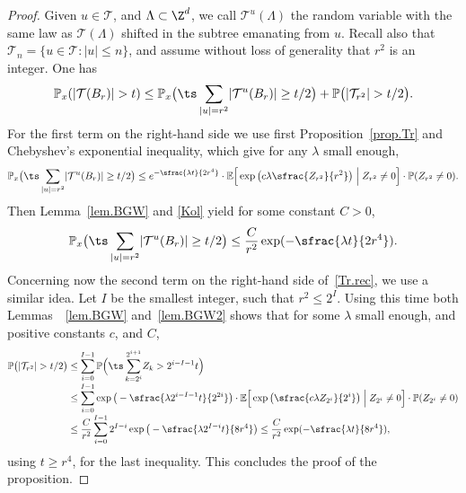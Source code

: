 \begin{proof}
Given $u\in \mathcal T$, and $\Lambda\subset \Z^d$, we
call $\mathcal T^u(\Lambda)$ the random variable with the same law
as $\mathcal T(\Lambda)$ shifted in the subtree emanating from $u$.
Recall also that \hbox{$\mathcal T_n=\{u\in \mathcal T: |u|\le n\}$}, and assume without loss of generality that $r^2$ is an integer.
One has\vspace*{-3pt}
\begin{equation}\label{Tr.rec}
\mathbb P_x(|\mathcal T(B_r)|>t) \le \mathbb P_x\big({\ts\sum_{|u|=r^2}} |\mathcal T^u(B_r)|\ge t/2\big)+
\mathbb P\big(|\mathcal T_{r^2}|>t/2\big).
\end{equation}
For the first term on the right-hand side we use first Proposition~\ref{prop.Tr} and Chebyshev's exponential inequality,
which give for any $\lambda$ small enough,\vspace*{-3pt}
\[
\mathbb P_x\big({\ts\sum_{|u|=r^2}} |\mathcal T^u(B_r)|\ge t/2\big) \le e^{- \sfrac{\lambda t}{2r^4}} \cdot \mathbb E\Big[\exp\big(c\lambda \sfrac{Z_{r^2}}{r^2}\big)\Bigm|Z_{r^2}\neq 0\Big]\cdot \mathbb P(Z_{r^2}\neq 0).
\]
Then Lemma~\ref{lem.BGW} and \eqref{Kol} yield for some constant $C>0$,\vspace*{-3pt}
\[
\mathbb P_x\big({\ts\sum_{|u|=r^2}} |\mathcal T^u(B_r)|\ge t/2\big)
\le \frac{C}{r^2} \exp(-\sfrac{\lambda t}{2r^4}).
\]
Concerning now the second term on the right-hand side of~\eqref{Tr.rec}, we use a similar idea.
Let $I$ be the smallest integer, such that $r^2\le 2^I$. Using this time both Lemmas~~\ref{lem.BGW} and~\ref{lem.BGW2} shows that
for some $\lambda$ small enough, and positive constants $c$, and $C$,\vspace*{-3pt}
\begin{align*}
\mathbb P\big(|\mathcal T_{r^2}|>t/2\big) & \le \sum_{i=0}^{I-1} \mathbb P\Big({\ts\sum_{k=2^i}^{2^{i+1}}} Z_k >2^{i-I-1} t\Big)\\[-3pt]
& \le \sum_{i=0}^{I-1} \exp\big(-\sfrac{\lambda 2^{i-I-1}t}{2^{2i}}\big)\cdot \mathbb E\Big[\exp\big(\sfrac{c\lambda Z_{2^i}}{2^i}\big)\Bigm|  Z_{2^i}\neq 0\Big]\cdot \mathbb P(Z_{2^i}\neq 0) \\[-3pt]
& \le \frac{C}{r^2} \sum_{i=0}^{I-1}2^{I-i} \exp\big(-\sfrac{\lambda 2^{I-i}t}{8r^4}\big) \le \frac{C}{r^2} \exp(-\sfrac{\lambda t}{8r^4}),
\end{align*}
using $t\ge r^4$, for the last inequality. This concludes the proof of the proposition.
\end{proof}

